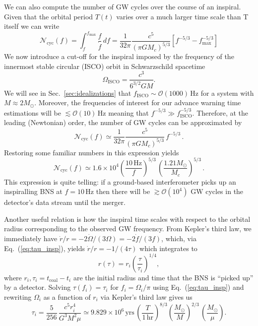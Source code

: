 \documentclass[amsmath,amssymb,aps,floats,amsfonts,notitlepage,superscriptaddress,eqsecnum,nofootinbib,10pt]{revtex4-1}
\newcommand{\ord}{\mathcal{O}}
\newcommand{\f}{\frac}
\newcommand{\be}{\begin{equation}}
\newcommand{\ee}{\end{equation}}
\begin{document}
We can also compute the number of GW cycles over the course of an inspiral. Given that the orbital period $T(t)$ varies over a much larger time scale than T itself
we can write
%
\be
\mathcal{N}_\text{cyc}(f) = \int_f^{f_\text{max}} \f{f}{\dot{f}}\, df =\f{1}{32\pi} \f{c^5}{(\pi G M_c)^{5/3}}\left[ f^{-5/3}-f_\text{max}^{-5/3}\right] \label{eq:Ncyc1}
\ee
%
We now introduce a cut-off for the inspiral imposed by the frequency of the innermost stable circular (ISCO) orbit in Schwarzschild spacetime
\be
\Omega_\text{ISCO} = \f{c^3}{6^{3/2} G M} \label{eq:Sch_f_isco}.
\ee
%
%
We will see in Sec.~\ref{sec:idealizations} that $f_\text{ISCO} \sim \mathcal{O}(1000)\,$Hz for a system with $M\approx 2 M_\odot$. Moreover, the frequencies of interest for our advance warning time estimations will be $\lesssim \mathcal{O}(10)\,$Hz
meaning that $f^{-5/3} \gg f_\text{ISCO}^{-5/3}$. Therefore, at the leading (Newtonian) order, the number of GW cycles can be approximated by
%
\be
\mathcal{N}_\text{cyc}(f) \simeq \f{1}{32\pi} \f{c^5}{(\pi G M_c)^{5/3}}\, f^{-5/3} \, . \label{eq:Ncyc2}
\ee
%
Restoring some familiar numbers in this expression yields
%
\be
\mathcal{N}_\text{cyc}(f)\simeq 1.6\times 10^4 \left(\f{10\,\text{Hz}}{f} \right)^{5/3}\,\left(\f{1.21 M_\odot}{M_c}\right)^{5/3}\label{eq:Ncyc3}\, .
\ee
%
This expression is quite telling: if a ground-based interferometer picks up an
inspiralling BNS at $f=10\,$Hz then there will be $\gtrsim \ord(10^4)$ GW cycles in the detector's data stream until the merger.

Another useful relation is how the inspiral time scales with respect to the orbital radius corresponding to the observed GW frequency.
From Kepler's third law, we immediately have $\dot{r}/r= -2\dot{\Omega}/(3\Omega)=-2\dot{f}/(3f)$, which, via Eq.~(\ref{eq:tau_insp}),
yields $\dot{r}/r= -1/(4\tau)$ which integrates to
%
\be
r(\tau)=r_i \left(\f{\tau}{\tau_i}\right)^{1/4}\label{eq:r_of_tau},
\ee
%
where $r_i, \tau_i=t_\text{coal}-t_i$ are the initial radius and time that the BNS
is ``picked up'' by a detector. Solving $\tau(f_i)=\tau_i$ for $f_i=\Omega_i/\pi$ using Eq.~(\ref{eq:tau_insp}) and rewriting $\Omega_i$ as a function of $r_i$ via
Kepler's third law gives us
%
\be
\tau_i = \f{5}{256}\, \f{c^5 r_i^4}{G^3 M^2 \mu}\simeq 9.829\times 10^6\,\text{yrs}\, \left(\f{T}{1\,\text{hr}}\right)^{8/3} \left(\f{M_\odot}{M}\right)^{2/3}\,\left(\f{M_\odot}{\mu}\right) \label{eq:tau_of_r}.
\ee
%
\end{document}
